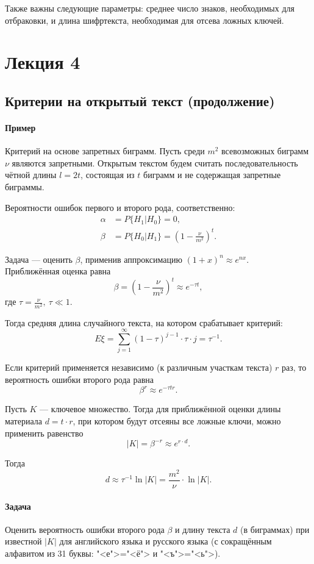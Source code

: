 \documentclass[a4paper,12pt]{article}
\newcommand{\lection}[1]{\section*{#1}
	\addtocounter{section}{1}
	\addcontentsline{toc}{section}{#1}
	\setcounter{subsection}{0}
}
\begin{document}
Также важны следующие параметры: среднее число знаков, необходимых для отбраковки, и длина шифртекста, необходимая для отсева ложных ключей.


\pagebreak
\lection{Лекция 4}

\subsection{Критерии на открытый текст (продолжение)}

\paragraph{Пример}
Критерий на основе запретных биграмм.
Пусть среди $m^2$ всевозможных биграмм $\nu$ являются запретными. Открытым текстом будем считать последовательность чётной длины $l=2t$, состоящая из $t$ биграмм и не содержащая запретные биграммы.

Вероятности ошибок первого и второго рода, соответственно:
$$
\begin{aligned}
	\alpha &= P\{H_1|H_0\} = 0, \\
	\beta &=  P\{H_0|H_1\} = (1-\frac{\nu}{m^2})^t.
\end{aligned}$$

Задача --- оценить $\beta$, применив аппроксимацию $(1+x)^n \approx e^{nx}$. \\

Приближённая оценка равна
$$
\beta = (1-\frac{\nu}{m^2})^t \approx e^{-\tau t},
$$
где $\tau = \frac{\nu}{m^2}, ~ \tau \ll 1. $

Тогда средняя длина случайного текста, на котором срабатывает критерий:
$$
E\xi = \sum_{j=1}^{\infty}(1-\tau)^{j-1} \cdot \tau \cdot j = \tau^{-1}.
$$

Если критерий применяется независимо (к различным участкам текста) $r$ раз, то вероятность ошибки второго рода равна
$$
\beta^r \approx e^{-\tau t r}.
$$

Пусть $K$ --- ключевое множество. Тогда для приближённой оценки длины материала $d = t \cdot r$, при котором будут отсеяны все ложные ключи, можно применить равенство
$$
|K| = \beta^{-r} \approx e^{r \cdot d}.
$$

Тогда
$$
d \approx \tau^{-1} \ln|K| = \frac{m^2}{\nu} \cdot \ln |K|.
$$

\paragraph{Задача}
Оценить вероятность ошибки второго рода $\beta$ и длину текста $d$ (в биграммах) при известной $|K|$ для английского языка и русского языка (с сокращённым алфавитом из 31 буквы: "<е">="<ё"> и "<ъ">="<ь">).
\end{document}

